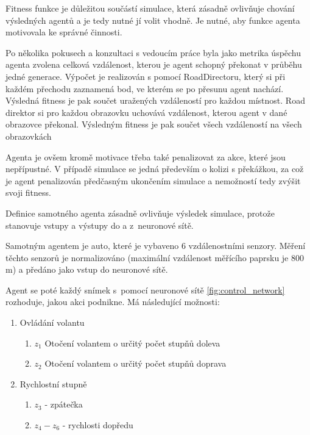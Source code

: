 \label{sec:fitness}
Fitness funkce je důležitou součástí simulace, která zásadně ovlivňuje chování výsledných agentů a je tedy nutné jí volit vhodně. Je nutné, aby funkce agenta motivovala ke správné činnosti.

Po několika pokusech a konzultaci s vedoucím práce byla jako metrika úspěchu agenta zvolena celková vzdálenost, kterou je agent schopný překonat v průběhu jedné generace. Výpočet je realizován s pomocí RoadDirectoru, který si při každém přechodu zaznamená bod, ve kterém se po přesunu agent nachází. Výsledná fitness je pak součet uražených vzdáleností pro každou místnost. Road direktor si pro každou obrazovku uchovává vzdálenost, kterou agent v dané obrazovce překonal. Výsledným fitness je pak součet všech vzdáleností na všech obrazovkách

Agenta je ovšem kromě motivace třeba také penalizovat za akce, které jsou nepřípustné. V případě simulace se jedná především o kolizi s překážkou, za což je agent penalizován předčasným ukončením simulace a nemožností tedy zvýšit svoji fitness.

Definice samotného agenta zásadně ovlivňuje výsledek simulace, protože stanovuje vstupy a výstupy do a z~neuronové sítě. 

Samotným agentem je auto, které je vybaveno 6 vzdálenostními senzory. Měření těchto senzorů je normalizováno (maximální vzdálenost měřícího paprsku je 800 m) a předáno jako vstup do neuronové sítě.

Agent se poté každý snímek s~pomocí neuronové sítě \ref{fig:control_network} rozhoduje, jakou akci podnikne. Má následující možnosti:

\begin{enumerate}
	\item Ovládání volantu 
	\begin{enumerate}
		\item $z_1$ Otočení volantem o určitý počet stupňů doleva
		\item $z_2$ Otočení volantem o určitý počet stupňů doprava
	\end{enumerate} 
	\item Rychlostní stupně
	\begin{enumerate}
		\item $z_3$ - zpátečka
		\item $z_4 - z_6$ - rychlosti dopředu
	\end{enumerate}
\end{enumerate}

